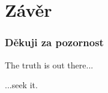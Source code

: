 	\section{Závěr}

	\begin{frame}
		\frametitle{Děkuji za pozornost}
		\begin{flushleft}
			\begin{huge}The truth is out there...\end{huge}
		\end{flushleft}
		\begin{flushright}
			\begin{huge}...seek it.\end{huge}
		\end{flushright}
	\end{frame}














\fi

